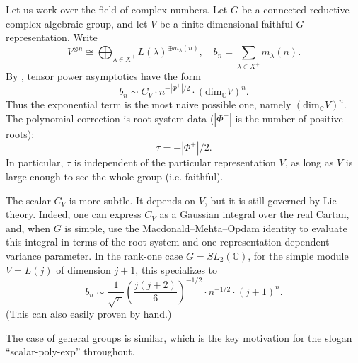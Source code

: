 \documentclass[a4paper,11pt]{amsart}
\newcommand{\C}{\mathbb{C}}
\renewcommand{\dim}[1][\C]{\mathrm{dim}_{#1}}
\numberwithin{equation}{subsection}
\theoremstyle{definition}
\theoremstyle{remark}
\begin{document}
\begin{Example}\label{E:Groups}
Let us work over the field of complex numbers.
Let \(G\) be a connected reductive complex algebraic group, and let \(V\)
be a finite dimensional faithful \(G\)-representation. Write
\[
V^{\otimes n}\cong \bigoplus_{\lambda\in X^+}
L(\lambda)^{\oplus m_\lambda(n)},\quad
b_n=\sum_{\lambda\in X^+}m_\lambda(n).
\]
By \cite{Bi-asymptotic-lie,CEO19}, tensor power asymptotics have the form
\[
b_n\sim C_V\cdot n^{-|\Phi^+|/2}\cdot (\dim V)^n .
\]
Thus the exponential term is the most naive possible one, namely
\((\dim V)^n\). The polynomial correction is root-system data ($|\Phi^+|$ is the number of positive roots):
\[
\tau=-|\Phi^+|/2.
\]
In particular, \(\tau\) is independent of the particular representation
\(V\), as long as \(V\) is large enough to see the whole group (i.e. faithful).

The scalar \(C_V\) is more subtle. It depends on \(V\), but it is still
governed by Lie theory. Indeed, one can express \(C_V\)
as a Gaussian integral over the real Cartan, and, when \(G\) is simple, use
the Macdonald--Mehta--Opdam identity to evaluate this integral in terms of
the root system and one representation dependent variance parameter.
In the rank-one case \(G=SL_2(\C)\), for the simple module
\(V=L(j)\) of dimension $j+1$, this specializes to
\[
b_n\sim
\frac{1}{\sqrt{\pi}}
\left(\frac{j(j+2)}{6}\right)^{-1/2}
\cdot
n^{-1/2}\cdot
(j+1)^n.
\]
(This can also easily proven by hand.)

The case of general groups is similar, which is the key motivation for the slogan ``scalar-poly-exp'' throughout.
\end{Example}
\end{document}
